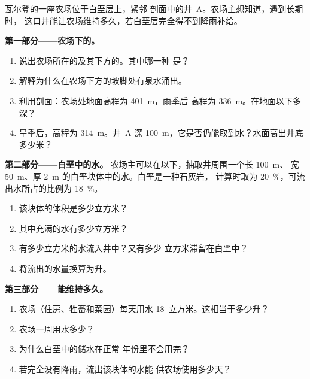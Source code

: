 \begin{problem}
\label{pb:g6:water-underground:1}
瓦尔登的一座农场位于白垩层上，紧邻
剖面中的井~A。农场主想知道，遇到长期时，
这口井能让农场维持多久，若白垩层完全得不到降雨补给。

\medskip
\noindent\textbf{第一部分——农场下的。}
\begin{enumerate}
  \item 说出农场所在的及其下方的。其中哪一种
        是？
  \item 解释为什么在农场下方的坡脚处有泉水涌出。
  \item 利用剖面：农场处地面高程为 401~m，雨季后
        高程为 336~m。在地面以下多深？
  \item 旱季后，高程为 314~m。井~A
        深 100~m，它是否仍能取到水？水面高出井底多少米？
\end{enumerate}

\medskip
\noindent\textbf{第二部分——白垩中的水。}
农场主可以在以下，抽取井周围一个长 100~m、
宽 50~m、厚 2~m 的白垩块体中的水。白垩是一种石灰岩，
计算时取为 20~\%，可流出水所占的比例为 18~\%。
\begin{enumerate}[resume]
  \item 该块体的体积是多少立方米？
  \item 其中充满的水有多少立方米？
  \item 有多少立方米的水流入井中？又有多少
        立方米滞留在白垩中？
  \item 将流出的水量换算为升。
\end{enumerate}

\medskip
\noindent\textbf{第三部分——能维持多久。}
\begin{enumerate}[resume]
  \item 农场（住房、牲畜和菜园）每天用水
        18~立方米。这相当于多少升？
  \item 农场一周用水多少？
  \item 为什么白垩中的储水在正常
        年份里不会用完？
  \item 若完全没有降雨，流出该块体的水能
        供农场使用多少天？
\end{enumerate}
\end{problem}
